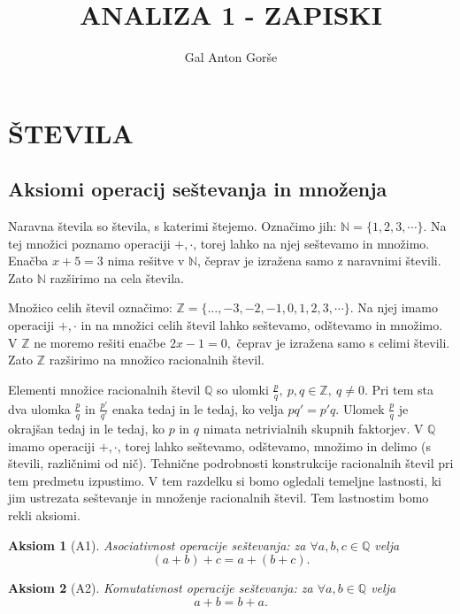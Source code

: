\documentclass[10pt, a4paper]{article}
\newtheorem{aksiom}{Aksiom}[section]
\newcommand{\N}{\mathbb {N}}
\newcommand{\Z}{\mathbb {Z}}
\newcommand{\Q}{\mathbb {Q}}
\begin{document}
\title{ANALIZA 1 - ZAPISKI}
\author{Gal Anton Gorše}
\date{}
\maketitle

\tableofcontents

\clearpage
    \section{ŠTEVILA}
\subsection{Aksiomi operacij seštevanja in množenja}

Naravna števila so števila, s katerimi štejemo. Označimo jih:
$\mathbb{N} = \{1,2,3,\cdots\}.$   
Na tej množici poznamo operaciji $+,\cdot$, torej lahko na njej seštevamo in množimo.
Enačba $x + 5 = 3$ nima rešitve v $\mathbb{N}$, čeprav je izražena samo z naravnimi števili. Zato $\N$ razširimo na cela števila.
    
Množico celih števil označimo: $\mathbb{Z} = \{\dots, -3, -2, -1, 0,1,2,3,\cdots\}.$
Na njej imamo operaciji $+,\cdot$ in na množici celih števil lahko seštevamo, odštevamo in množimo.
V $\Z$ ne moremo rešiti enačbe $2x - 1 = 0,$ čeprav je izražena samo s celimi števili. Zato $\Z$ razširimo na množico racionalnih števil.

Elementi množice racionalnih števil $\Q$ so ulomki $\frac{p}{q},\ p,q \in \mathbb{Z},\ q \neq 0$. Pri tem sta dva ulomka $\frac{p}{q}$ in $\frac{p'}{q'}$ enaka tedaj in le tedaj, ko velja $pq' = p'q$.
Ulomek $\frac{p}{q}$ je okrajšan tedaj in le tedaj, ko $p$ in $q$ nimata netrivialnih skupnih faktorjev.
V $\Q$ imamo operaciji $+,\cdot$, torej lahko seštevamo, odštevamo, množimo in delimo (s števili, različnimi od nič). 
Tehnične podrobnosti konstrukcije racionalnih števil pri tem predmetu izpustimo. V tem razdelku si bomo ogledali 
temeljne lastnosti, ki jim ustrezata seštevanje in množenje racionalnih števil. Tem lastnostim bomo rekli aksiomi.

\begin{aksiom}[A1]
    Asociativnost operacije seštevanja: za $\forall a,b,c \in \mathbb{Q}$ velja $$(a+b)+c = a+(b+c).$$
\end{aksiom}

\begin{aksiom}[A2]
    Komutativnost operacije seštevanja: za $\forall a,b \in \mathbb{Q}$ velja $$a+b = b+a.$$
\end{aksiom}
\end{document}
